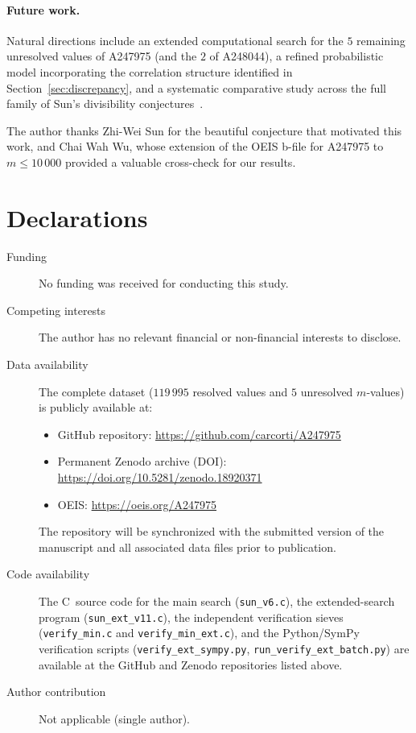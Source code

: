 \documentclass[pdflatex,sn-mathphys-num,Numbered]{sn-jnl}
\theoremstyle{thmstyleone}
\theoremstyle{thmstylethree}
\theoremstyle{thmstyletwo}
\numberwithin{equation}{section}
\begin{document}
\paragraph{Future work.}
Natural directions include an extended computational
search for the $5$ remaining unresolved values of A247975
(and the $2$ of A248044), a refined probabilistic
model incorporating the correlation structure identified in
Section~\ref{sec:discrepancy},
and a systematic comparative study across the full family of
Sun's divisibility conjectures~\cite{Sun2019}.

\backmatter


The author thanks Zhi-Wei Sun for the beautiful conjecture that
motivated this work, and Chai Wah Wu, whose extension of the OEIS
b-file for A247975 to $m \leq 10\,000$ provided a valuable
cross-check for our results.

\section*{Declarations}

\begin{description}
\item[Funding] No funding was received for conducting this study.

\item[Competing interests] The author has no relevant financial
  or non-financial interests to disclose.

\item[Data availability] \label{sec:data}
  The complete dataset ($119\,995$ resolved values and $5$ unresolved
  $m$-values) is publicly available at:
  \begin{itemize}
    \item GitHub repository:
          \url{https://github.com/carcorti/A247975}
    \item Permanent Zenodo archive (DOI):\\
          \url{https://doi.org/10.5281/zenodo.18920371}
    \item OEIS: \url{https://oeis.org/A247975}
  \end{itemize}
  The repository will be synchronized with the submitted version of the
  manuscript and all associated data files prior to publication.

\item[Code availability]
  The C~source code for the main search
  (\texttt{sun\_v6.c}), the extended-search program
  (\texttt{sun\_ext\_v11.c}), the independent verification sieves
  (\texttt{verify\_min.c} and \texttt{verify\_min\_ext.c}), and the
  Python/SymPy verification scripts
  (\texttt{verify\_ext\_sympy.py}, \texttt{run\_verify\_ext\_batch.py})
  are available at the GitHub and Zenodo repositories listed above.

\item[Author contribution] Not applicable (single author).
\end{description}
\end{document}
